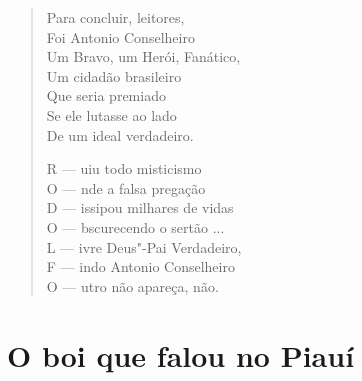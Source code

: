 \begin{verse}
Para concluir, leitores, \\
Foi Antonio Conselheiro \\
Um Bravo, um Herói, Fanático, \\
Um cidadão brasileiro \\
Que seria premiado \\
Se ele lutasse ao lado \\
De um ideal verdadeiro. 
\pagebreak

R --- uiu todo misticismo \\
O --- nde a falsa pregação \\
D --- issipou milhares de vidas \\
O --- bscurecendo o sertão ... \\
L --- ivre Deus"-Pai Verdadeiro, \\
F --- indo Antonio Conselheiro \\
O --- utro não apareça, não. 
\end{verse}

\chapter{O boi que falou no Piauí}

